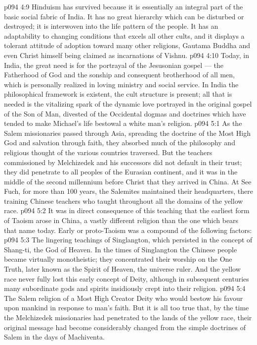 \vs p094 4:9 Hinduism has survived because it is essentially an integral part of the basic social fabric of India. It has no great hierarchy which can be disturbed or destroyed; it is interwoven into the life pattern of the people. It has an adaptability to changing conditions that excels all other cults, and it displays a tolerant attitude of adoption toward many other religions, Gautama Buddha and even Christ himself being claimed as incarnations of Vishnu.
\vs p094 4:10 Today, in India, the great need is for the portrayal of the Jesusonian gospel --- the Fatherhood of God and the sonship and consequent brotherhood of all men, which is personally realized in loving ministry and social service. In India the philosophical framework is existent, the cult structure is present; all that is needed is the vitalizing spark of the dynamic love portrayed in the original gospel of the Son of Man, divested of the Occidental dogmas and doctrines which have tended to make Michael’s life bestowal a white man’s religion.
\vs p094 5:1 As the Salem missionaries passed through Asia, spreading the doctrine of the Most High God and salvation through faith, they absorbed much of the philosophy and religious thought of the various countries traversed. But the teachers commissioned by Melchizedek and his successors did not default in their trust; they did penetrate to all peoples of the Eurasian continent, and it was in the middle of the second millennium before Christ that they arrived in China. At See Fuch, for more than 100 years, the Salemites maintained their headquarters, there training Chinese teachers who taught throughout all the domains of the yellow race.
\vs p094 5:2 It was in direct consequence of this teaching that the earliest form of Taoism arose in China, a vastly different religion than the one which bears that name today. Early or proto\hyp{}Taoism was a compound of the following factors:
\vs p094 5:3 \bibnobreakspace The lingering teachings of Singlangton, which persisted in the concept of Shang\hyp{}ti, the God of Heaven. In the times of Singlangton the Chinese people became virtually monotheistic; they concentrated their worship on the One Truth, later known as the Spirit of Heaven, the universe ruler. And the yellow race never fully lost this early concept of Deity, although in subsequent centuries many subordinate gods and spirits insidiously crept into their religion.
\vs p094 5:4 \bibnobreakspace The Salem religion of a Most High Creator Deity who would bestow his favour upon mankind in response to man’s faith. But it is all too true that, by the time the Melchizedek missionaries had penetrated to the lands of the yellow race, their original message had become considerably changed from the simple doctrines of Salem in the days of Machiventa.
